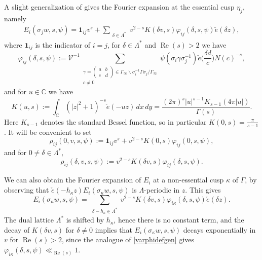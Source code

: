 \documentclass[12pt,reqno]{amsart}
\numberwithin{equation}{section}
\renewcommand{\Re}{\operatorname{Re}}
\renewcommand{\pmatrix}[4]{\left(\begin{smallmatrix}#1 & #2 \\ #3 & #4\end{smallmatrix}\right)}
\begin{document}
A slight generalization of \cite[\S3.4, Theorem 4.1]{EGM} gives the Fourier expansion at the essential cusp $\eta_j$, namely 
\begin{align} \label{eisfourier}
    E_{i}(\sigma_{j} w,s,\psi) = \mathbf{1}_{i j} v^s + \sum_{\substack{\delta \in \Lambda^* }} v^{2-s} K (\delta v,s) \varphi_{i j}(\delta,s,\psi) \check{e}( \delta z ), 
\end{align}
where $\mathbf{1}_{i j}$ is the indicator of $i = j$, for $\delta \in \Lambda^*$ and $\Re(s)>2$ we have
\begin{equation} \label{varphidefgen}
    \varphi_{i j}(\delta,s,\psi):=\mathcal{V}^{-1} \sum_{\substack{\gamma=\pmatrix {a} {b} {c} {d}  \in \Gamma_{\infty} \backslash \sigma^{-1}_{i} \Gamma \sigma_{j} / \Gamma_{\infty} \\ c \neq 0 }} \overline{\psi}(\sigma_i \gamma \sigma_j^{-1}) \check{e} \Big( \frac{\delta d}{c} \Big)  N(c)^{-s},   
\end{equation}
and for $u \in \mathbb{C}$ we have
\begin{equation} \label{Kintdef}
    K(u,s):=\int_{\mathbb{C}} (|z|^2+1)^{-s} \check{e}(-uz) \, dx \, dy = \frac{(2 \pi)^s |u|^{s-1} K_{s-1}(4 \pi |u|)}{\Gamma(s)}.
\end{equation}
Here $K_{s-1}$ denotes the standard Bessel function, so in particular $K(0,s)=\frac{\pi}{s-1}$. It will be convenient to set 
\begin{equation} \label{rhozero}
    \rho_{i j}(0,v,s,\psi):=\mathbf{1}_{i j} v^s+v^{2-s} K(0,s)  \varphi_{i j}(0,s,\psi),
\end{equation}
and for $0 \neq \delta \in \Lambda^*$,
\begin{equation} \label{rhononzero}
    \rho_{i j}(\delta,v,s,\psi):= v^{2-s} K (\delta v,s) \varphi_{i j}(\delta,s,\psi).
\end{equation}

\begin{remark}\label{rmk:non_essential_cusps}
    We can also obtain the Fourier expansion of $E_i$ at a non-essential cusp $\kappa$ of $\Gamma$, by observing that $\check{e}(-h_\kappa z) E_i(\sigma_\kappa w, s, \psi)$ is $\Lambda$-periodic in $z$. This gives
    \begin{equation*}
        E_{i}(\sigma_{\kappa} w,s,\psi) = \sum_{\substack{\delta - h_\kappa \in \Lambda^*}} v^{2-s} K (\delta v,s) \varphi_{i \kappa}(\delta,s,\psi) \check{e}( \delta z ).
    \end{equation*} 
    The dual lattice $\Lambda^*$ is shifted by $h_\kappa$, hence there is no constant term, and the decay of $K(\delta v, s)$ for $\delta \neq 0$ implies that $E_i(\sigma_\kappa w, s, \psi)$ decays exponentially in $v$ for $\Re(s) > 2$, since the analogue of \eqref{varphidefgen} gives $\varphi_{i \kappa}(\delta, s, \psi) \ll_{\Re(s)} 1$. 
\end{remark}
\end{document}
